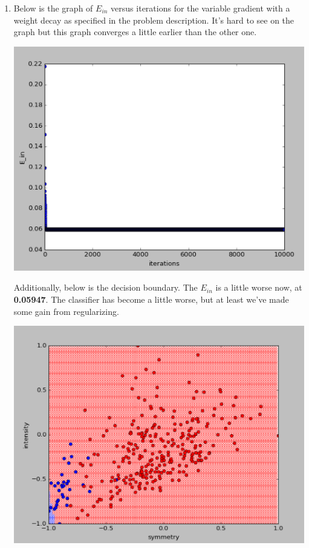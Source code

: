 \documentclass[12pt]{article}
\begin{document}
\begin{enumerate}[label=(\alph*)]
	\item Below is the graph of $E_{in}$ versus iterations for the variable gradient with a weight decay as specified in the problem description. It's hard to see on the graph but this graph converges a little earlier than the other one.
	
	\includegraphics[scale=0.6]{2b1.png}
	
	Additionally, below is the decision boundary. The $E_{in}$ is a little worse now, at \textbf{0.05947}. The classifier has become a little worse, but at least we've made some gain from regularizing.
	
	\includegraphics[scale=0.6]{2b2.png}
	

\end{enumerate}
\end{document}
